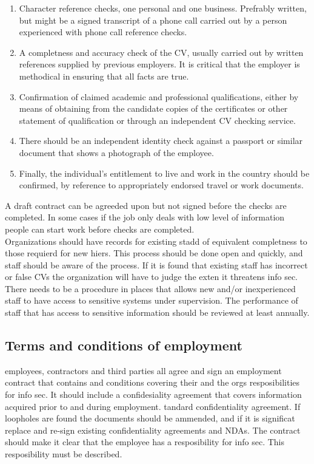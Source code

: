 \begin{enumerate}
    \item Character reference checks, one personal and one business. Prefrably 
        written, but might be a signed transcript of a phone call carried out
        by a person experienced with phone call reference checks.

    \item A completness and accuracy check of the CV, usually carried out by
        written references supplied by previous employers. It is critical that
        the employer is methodical in ensuring that all facts are true.

    \item  Confirmation of claimed academic and professional qualifications,
        either by means of obtaining from the candidate copies of the
        certificates or other statement of qualification or through an
        independent CV checking service.

    \item There should be an independent identity check against a passport or 
        similar document that shows a photograph of the employee.

    \item  Finally, the individual’s entitlement to live and work in the country
        should be confirmed, by reference to appropriately endorsed travel or
        work documents.
\end{enumerate}
A draft contract can be agreeded upon but not signed before the checks are 
completed. In some cases if the job only deals with low level of information
people can start work before checks are completed.\\

Organizations should have records for existing stadd of equivalent completness
to those requierd for new hiers. This process should be done open and quickly,
and staff should be aware of the process. If it is found that existing staff has
incorrect or false CVs the organization will have to judge the exten it 
threatens info sec. There needs to be a procedure in places that allows new 
and/or inexperienced staff to have access to sensitive systems under supervision.
The performance of staff that has access to sensitive information should be 
reviewed at least annually.

\subsection{Terms and conditions of employment}
employees, contractors and third parties all agree and sign an employment
contract that contains and conditions covering their and the orgs 
resposibilities for info sec. It should include a confidesiality agreement
that covers information acquired prior to and during employment.
tandard confidentiality agreement. If loopholes are found the documents should
be ammended, and if it is significat replace and re-sign existing confidentiality
agreements and NDAs. The contract should make it clear that the employee has a
resposibility for info sec. This resposibility must be described.

